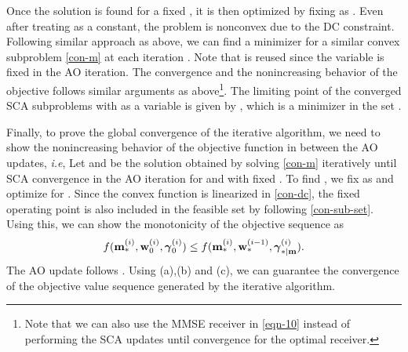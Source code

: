 Once the solution is found for a fixed \me{\my}, it is then optimized by fixing \me{\mx} as . Even after treating \me{\mx} as a constant, the problem is nonconvex due to the \ac{DC} constraint. Following similar approach as above, we can find a minimizer  for a similar convex subproblem \eqref{con-m} at each iteration . Note that  is reused since the variable \me{\mx} is fixed in the  \ac{AO} iteration. The convergence and the nonincreasing behavior of the objective follows similar arguments as above\footnote{Note that we can also use the \ac{MMSE} receiver in \eqref{eqn-10} instead of performing the \ac{SCA} updates until convergence for the optimal receiver.}. The limiting point of the converged \ac{SCA} subproblems with \me{\my} as a variable is given by , which is a minimizer in the set .

Finally, to prove the global convergence of the iterative algorithm, we need to show the nonincreasing behavior of the objective function in between the \ac{AO} updates, \textit{i.e}, 
\iftoggle{single_column}{
\begin{equation}\allowdisplaybreaks
f(\iter{\mx}{\ast}{i},\iter{\my}{\ast}{i},\iter{\mz}{\ast|\mx}{i}) \leq f(\iter{\mx}{\ast}{i},\iter{\my}{0}{i},\iter{\mz}{0}{i}) \leq f(\iter{\mx}{\ast}{i},\iter{\my}{\ast}{i-1},\iter{\mz}{\ast|\my}{i}).
\end{equation}}{
\begin{multline}\allowdisplaybreaks
f(\iter{\mx}{\ast}{i},\iter{\my}{\ast}{i},\iter{\mz}{\ast|\mx}{i}) \leq f(\iter{\mx}{\ast}{i},\iter{\my}{0}{i},\iter{\mz}{0}{i}) \\
\leq f(\iter{\mx}{\ast}{i},\iter{\my}{\ast}{i-1},\iter{\mz}{\ast|\my}{i}).
\end{multline}}
Let  and  be the solution obtained by solving \eqref{con-m} iteratively until \ac{SCA} convergence in the  \ac{AO} iteration for \eqn{\mx} and \eqn{\mz} with fixed . To find , we fix \eqn{\mx} as  and optimize for \me{\my}. Since the convex function is linearized in \eqref{con-dc}, the fixed operating point is also included in the feasible set  by following \eqref{con-sub-set}. Using this, we can show the monotonicity of the objective sequence as
\begin{equation} \label{fixed_point}
f(\iter{\mx}{\ast}{i},\iter{\my}{0}{i},\iter{\mz}{0}{i}) \leq f(\iter{\mx}{\ast}{i},\iter{\my}{\ast}{i-1},\iter{\mz}{\ast|\mx}{i}).
\end{equation}
The \ac{AO} update follows . Using (a),(b) and (c), we can guarantee the convergence of the objective value sequence generated by the iterative algorithm.

